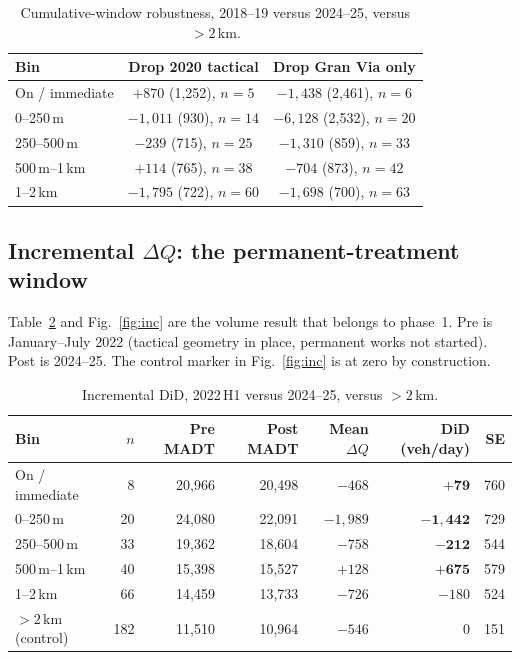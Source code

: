 \documentclass[a4paper,fleqn]{cas-dc}
\newcommand{\DQ}{\Delta Q}
\begin{document}
\begin{table}
\caption{Cumulative-window robustness, 2018--19 versus 2024--25, versus
$>2$\,km.}
\label{tab:robust}
\centering
\scriptsize
\begin{tabular}{@{}lcc@{}}
\toprule
Bin & Drop 2020 tactical & Drop Gran Via only \\
\midrule
On / immediate & $+870$ (1{,}252), $n=5$ & $-1{,}438$ (2{,}461), $n=6$ \\
0--250\,m & $-1{,}011$ (930), $n=14$ & $-6{,}128$ (2{,}532), $n=20$ \\
250--500\,m & $-239$ (715), $n=25$ & $-1{,}310$ (859), $n=33$ \\
500\,m--1\,km & $+114$ (765), $n=38$ & $-704$ (873), $n=42$ \\
1--2\,km & $-1{,}795$ (722), $n=60$ & $-1{,}698$ (700), $n=63$ \\
\bottomrule
\end{tabular}
\end{table}

\subsection{Incremental $\DQ$: the permanent-treatment window}

Table~\ref{tab:inc} and Fig.~\ref{fig:inc} are the volume result that belongs
to phase~1. Pre is January--July 2022 (tactical geometry in place, permanent
works not started). Post is 2024--25. The control marker in
Fig.~\ref{fig:inc} is at zero by construction.

\begin{table}
\caption{Incremental DiD, 2022\,H1 versus 2024--25, versus $>2$\,km.}
\label{tab:inc}
\centering
\small
\begin{tabular}{@{}lrrrrrr@{}}
\toprule
Bin & $n$ & Pre MADT & Post MADT & Mean $\DQ$ & DiD (veh/day) & SE \\
\midrule
On / immediate & 8 & 20{,}966 & 20{,}498 & $-468$ & $\mathbf{+79}$ & 760 \\
0--250\,m & 20 & 24{,}080 & 22{,}091 & $-1{,}989$ & $\mathbf{-1{,}442}$ & 729 \\
250--500\,m & 33 & 19{,}362 & 18{,}604 & $-758$ & $\mathbf{-212}$ & 544 \\
500\,m--1\,km & 40 & 15{,}398 & 15{,}527 & $+128$ & $\mathbf{+675}$ & 579 \\
1--2\,km & 66 & 14{,}459 & 13{,}733 & $-726$ & $-180$ & 524 \\
$>2$\,km (control) & 182 & 11{,}510 & 10{,}964 & $-546$ & 0 & 151 \\
\bottomrule
\end{tabular}
\end{table}
\end{document}
